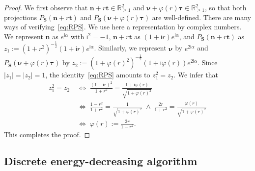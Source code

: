\documentclass[a4paper,11pt]{article}
\theoremstyle{definition}
\theoremstyle{remark}
\numberwithin{equation}{section}
\newcommand{\Real}{\mathbb{R}}
\newcommand{\bn}{{\boldsymbol n}}
\newcommand{\bt}{{\boldsymbol t}}
\newcommand{\bS}{{\boldsymbol S}}
\newcommand{\bnu}{{\boldsymbol \nu}}
\newcommand{\btau}{{\boldsymbol \tau}}
\newcommand{\sfi}{\mathsf{i}}
\begin{document}
\begin{proof}
We first observe that $\bn + r \bt \in \Real^2_{\ge1}$ and $\bnu + \varphi(r)\btau \in
\Real^2_{\ge1}$, so that both projections $P_{\bS}(\bn + r \bt)$ and
$P_{\bS}(\bnu + \varphi(r)\btau)$ are well-defined. There are many ways of 
verifying~\eqref{eq:RPS}. We use here a representation by complex numbers. 
We represent $\bn$ as $e^{\sfi\alpha}$ with $\sfi^2=-1$, $\bn+r\bt$ as $(1+\sfi r)e^{\sfi\alpha}$, and $P_{\bS}(\bn+r\bt)$ as $z_1:=(1+r^2)^{-\frac12}(1+\sfi r)e^{\sfi\alpha}$. Similarly,
we represent $\bnu$ by $e^{2\sfi\alpha}$ and $P_{\bS}(\bnu + \varphi(r)\btau)$ by
$z_2:=(1+\varphi(r)^2)^{-\frac12}(1+\sfi \varphi(r))e^{2\sfi\alpha}$. 
Since $|z_1|=|z_2|=1$, the identity~\eqref{eq:RPS} amounts to $z_1^2 = z_2$. We infer that
\begin{align*}
z_1^2 = z_2 & \; \Longleftrightarrow \; \frac{(1+\sfi r)^2}{1+r^2} = \frac{1+\sfi \varphi(r)}{\sqrt{1+\varphi(r)^2}} \\
& \; \Longleftrightarrow \; \frac{1-r^2}{1+r^2} = \frac{1}{\sqrt{1+\varphi(r)^2}} \; \wedge \;  \frac{2r}{1+r^2} = \frac{\varphi(r)}{\sqrt{1+\varphi(r)^2}} \\
& \; \Longleftrightarrow \; \varphi(r) := \frac{2r}{1-r^2}.
\end{align*}
This completes the proof.
\end{proof}

\subsection{Discrete energy-decreasing algorithm}
\end{document}
